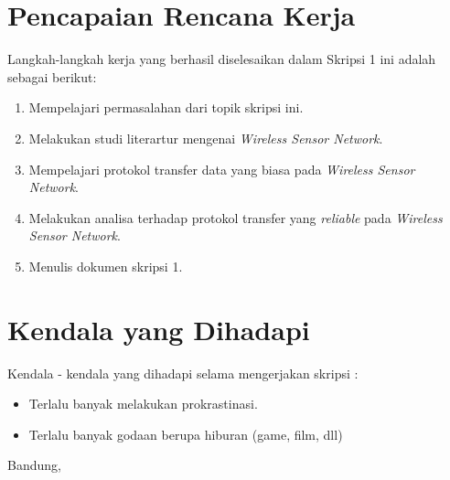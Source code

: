 \documentclass[a4paper,twoside]{article}
\begin{document}
\section{Pencapaian Rencana Kerja}
Langkah-langkah kerja yang berhasil diselesaikan dalam Skripsi 1 ini adalah sebagai berikut:
\begin{enumerate}
\item Mempelajari permasalahan dari topik skripsi ini.
\item Melakukan studi literartur mengenai \textit{Wireless Sensor Network}.
\item Mempelajari protokol transfer data yang biasa pada \textit{Wireless Sensor Network}.
\item Melakukan analisa terhadap protokol transfer yang \textit{reliable} pada \textit{Wireless Sensor Network}.
\item Menulis dokumen skripsi 1.
\end{enumerate}


\section{Kendala yang Dihadapi}
Kendala - kendala yang dihadapi selama mengerjakan skripsi :
\begin{itemize}
	\item Terlalu banyak melakukan prokrastinasi.
	\item Terlalu banyak godaan berupa hiburan (game, film, dll)
\end{itemize}

\vspace{1cm}
\centering Bandung, \tanggal\\
\vspace{2cm} \nama \\ 
\vspace{1cm}
\end{document}
